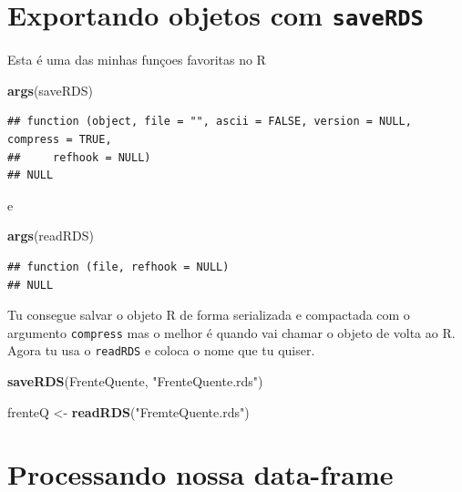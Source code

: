 \documentclass[]{book}
\newenvironment{Shaded}{\begin{snugshade}}{\end{snugshade}}
\newcommand{\KeywordTok}[1]{\textcolor[rgb]{0.13,0.29,0.53}{\textbf{#1}}}
\newcommand{\StringTok}[1]{\textcolor[rgb]{0.31,0.60,0.02}{#1}}
\newcommand{\NormalTok}[1]{#1}
\begin{document}
\section{\texorpdfstring{Exportando objetos com
\texttt{saveRDS}}{Exportando objetos com saveRDS}}\label{exportando-objetos-com-saverds}

Esta é uma das minhas funçoes favoritas no R

\begin{Shaded}
\begin{Highlighting}[]
\KeywordTok{args}\NormalTok{(saveRDS)}
\end{Highlighting}
\end{Shaded}

\begin{verbatim}
## function (object, file = "", ascii = FALSE, version = NULL, compress = TRUE, 
##     refhook = NULL) 
## NULL
\end{verbatim}

e

\begin{Shaded}
\begin{Highlighting}[]
\KeywordTok{args}\NormalTok{(readRDS)}
\end{Highlighting}
\end{Shaded}

\begin{verbatim}
## function (file, refhook = NULL) 
## NULL
\end{verbatim}

Tu consegue salvar o objeto R de forma serializada e compactada com o
argumento \texttt{compress} mas o melhor é quando vai chamar o objeto de
volta ao R. Agora tu usa o \texttt{readRDS} e coloca o nome que tu
quiser.

\begin{Shaded}
\begin{Highlighting}[]
\KeywordTok{saveRDS}\NormalTok{(FrenteQuente, }\StringTok{"FrenteQuente.rds"}\NormalTok{)}
\end{Highlighting}
\end{Shaded}

\begin{Shaded}
\begin{Highlighting}[]
\NormalTok{frenteQ <-}\StringTok{ }\KeywordTok{readRDS}\NormalTok{(}\StringTok{"FremteQuente.rds"}\NormalTok{)}
\end{Highlighting}
\end{Shaded}

\hypertarget{processing_dfs}{\section{Processando nossa
data-frame}\label{processing_dfs}}
\end{document}
